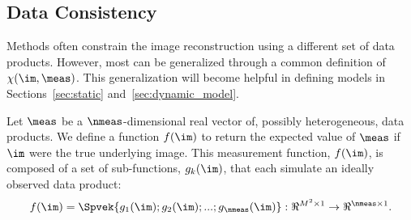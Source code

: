 


\vspace{-.1in}
\subsection{Data Consistency}
\label{sec:dataproducts}

Methods often constrain the image reconstruction using a different set of data products. However, most can be generalized through a common definition of $\chi(\im, \meas)$. This generalization will become helpful in defining models in Sections~\ref{sec:static} and~\ref{sec:dynamic_model}.



Let $\meas$ be a $\nmeas$-dimensional real vector of, possibly heterogeneous, data products. 
We define a function $f(\im)$ to return the expected value of $\meas$ if $\im$ were the true underlying image. This measurement function, $f(\im)$, is composed of a set of sub-functions, $g_k(\im)$, that each simulate an ideally observed data product: 
\begin{align}
f(\im) = \Spvek{g_1(\im); g_2(\im); ...; g_{\nmeas}(\im)} : \Re^{ M^2 \times 1} \rightarrow \Re^{ \nmeas \times 1 }.
\end{align}

